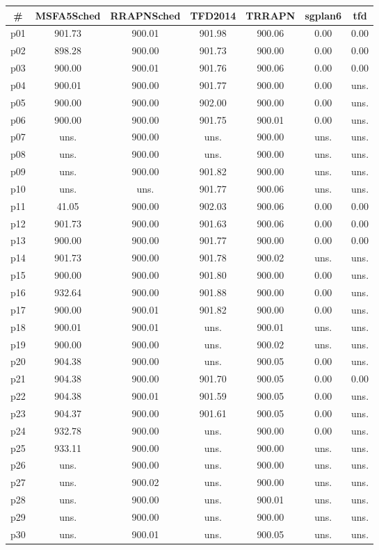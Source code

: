 \begin{tabular}{ccccccc}
\toprule
\textbf{\#} & \textbf{MSFA5Sched} & \textbf{RRAPNSched} & \textbf{TFD2014} & \textbf{TRRAPN} & \textbf{sgplan6} & \textbf{tfd}\\
\midrule
p01 & 901.73 & 900.01 & 901.98 & 900.06 & 0.00 & 0.00\\
p02 & 898.28 & 900.00 & 901.73 & 900.00 & 0.00 & 0.00\\
p03 & 900.00 & 900.01 & 901.76 & 900.06 & 0.00 & 0.00\\
p04 & 900.01 & 900.00 & 901.77 & 900.00 & 0.00 & uns.\\
p05 & 900.00 & 900.00 & 902.00 & 900.00 & 0.00 & uns.\\
p06 & 900.00 & 900.00 & 901.75 & 900.01 & 0.00 & uns.\\
p07 & uns. & 900.00 & uns. & 900.00 & uns. & uns.\\
p08 & uns. & 900.00 & uns. & 900.00 & uns. & uns.\\
p09 & uns. & 900.00 & 901.82 & 900.00 & uns. & uns.\\
p10 & uns. & uns. & 901.77 & 900.06 & uns. & uns.\\
p11 & 41.05 & 900.00 & 902.03 & 900.06 & 0.00 & 0.00\\
p12 & 901.73 & 900.00 & 901.63 & 900.06 & 0.00 & 0.00\\
p13 & 900.00 & 900.00 & 901.77 & 900.00 & 0.00 & 0.00\\
p14 & 901.73 & 900.00 & 901.78 & 900.02 & uns. & uns.\\
p15 & 900.00 & 900.00 & 901.80 & 900.00 & 0.00 & uns.\\
p16 & 932.64 & 900.00 & 901.88 & 900.00 & 0.00 & uns.\\
p17 & 900.00 & 900.01 & 901.82 & 900.00 & 0.00 & uns.\\
p18 & 900.01 & 900.01 & uns. & 900.01 & uns. & uns.\\
p19 & 900.00 & 900.00 & uns. & 900.02 & uns. & uns.\\
p20 & 904.38 & 900.00 & uns. & 900.05 & 0.00 & uns.\\
p21 & 904.38 & 900.00 & 901.70 & 900.05 & 0.00 & 0.00\\
p22 & 904.38 & 900.01 & 901.59 & 900.05 & 0.00 & uns.\\
p23 & 904.37 & 900.00 & 901.61 & 900.05 & 0.00 & uns.\\
p24 & 932.78 & 900.00 & uns. & 900.00 & 0.00 & uns.\\
p25 & 933.11 & 900.00 & uns. & 900.00 & uns. & uns.\\
p26 & uns. & 900.00 & uns. & 900.00 & uns. & uns.\\
p27 & uns. & 900.02 & uns. & 900.00 & uns. & uns.\\
p28 & uns. & 900.00 & uns. & 900.01 & uns. & uns.\\
p29 & uns. & 900.00 & uns. & 900.00 & uns. & uns.\\
p30 & uns. & 900.01 & uns. & 900.05 & uns. & uns.\\
\bottomrule
\end{tabular}


